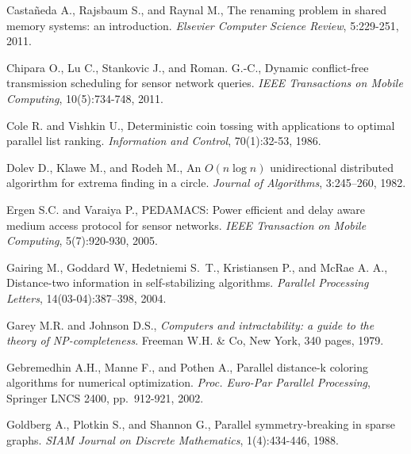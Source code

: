 \documentclass[11pt,english]{article}
\begin{document}
\begin{thebibliography}{99}
{\vspace{-0.1cm}
Casta\~neda A.,  Rajsbaum S., and  Raynal M., 
The renaming problem in shared memory systems: an introduction.
{\it Elsevier Computer Science Review}, 5:229-251, 2011. 

\vspace{-0.1cm}
Chipara O., Lu C., Stankovic J., and Roman. G.-C.,
Dynamic conflict-free transmission scheduling for sensor network
  queries.
{\it  IEEE Transactions on Mobile Computing}, 10(5):734-748, 2011.


\vspace{-0.1cm}
Cole R. and  Vishkin U., 
Deterministic coin tossing  with applications to optimal parallel list ranking.
{\it Information and Control}, 70(1):32-53, 1986.

\vspace{-0.1cm}
Dolev D., Klawe M.,  and Rodeh M.,
An $O(n\log n)$ unidirectional distributed algorirthm for extrema finding 
in a circle.
{\it Journal of Algorithms}, 3:245--260, 1982. 

\vspace{-0.1cm}
Ergen S.C. and  Varaiya P., 
PEDAMACS: Power efficient and delay aware medium access protocol
for sensor networks. 
{\it IEEE Transaction on Mobile Computing}, 5(7):920-930, 2005.

\vspace{-0.1cm}
Gairing M., Goddard W, Hedetniemi S.~T., Kristiansen P., and McRae
A. A.,
Distance-two information in self-stabilizing algorithms.
{\it Parallel Processing Letters}, 14(03-04):387--398, 2004.

\vspace{-0.1cm}
Garey M.R. and Johnson D.S.,
{\it Computers and intractability: a guide to the theory of  NP-completeness}. 
Freeman W.H. \& Co, New York, 340 pages, 1979.


\vspace{-0.1cm}
Gebremedhin A.H.,   Manne F., and  Pothen A., 
Parallel distance-k coloring algorithms for numerical optimization.
{\it Proc. Euro-Par  Parallel Processing}, 
Springer LNCS 2400,  pp.~912-921, 2002.  


\vspace{-0.1cm}
Goldberg A.,  Plotkin S.,  and Shannon G., 
Parallel symmetry-breaking in sparse graphs.
{\it SIAM Journal on Discrete Mathematics}, 1(4):434-446, 1988.

}
\end{thebibliography}
\end{document}
